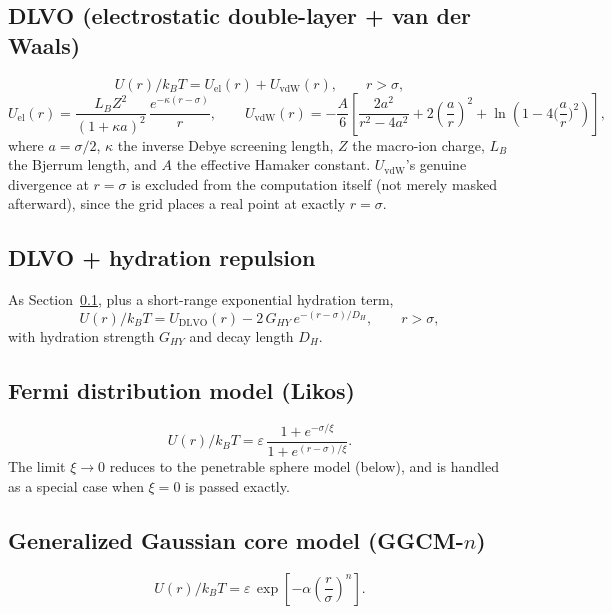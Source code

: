\documentclass[11pt,a4paper]{article}
\begin{document}
\subsection{DLVO (electrostatic double-layer + van der Waals)}
\label{sec:dlvo}
\begin{equation}
  U(r)/k_BT = U_{\mathrm{el}}(r) + U_{\mathrm{vdW}}(r), \qquad r>\sigma,
\end{equation}
\begin{equation}
  U_{\mathrm{el}}(r) = \frac{L_B Z^2}{(1+\kappa a)^2}\,\frac{e^{-\kappa(r-\sigma)}}{r},
  \qquad
  U_{\mathrm{vdW}}(r) = -\frac{A}{6}\left[\frac{2a^2}{r^2-4a^2}+2\left(\frac{a}{r}\right)^2
    +\ln\!\left(1-4\Big(\frac{a}{r}\Big)^2\right)\right],
\end{equation}
where $a=\sigma/2$, $\kappa$ the inverse Debye screening length, $Z$ the
macro-ion charge, $L_B$ the Bjerrum length, and $A$ the effective Hamaker
constant. $U_{\mathrm{vdW}}$'s genuine divergence at $r=\sigma$ is excluded from
the computation itself (not merely masked afterward), since the grid places a
real point at exactly $r=\sigma$.

\subsection{DLVO + hydration repulsion}
As Section~\ref{sec:dlvo}, plus a short-range exponential hydration term,
\begin{equation}
  U(r)/k_BT = U_{\mathrm{DLVO}}(r) - 2\,G_{HY}\,e^{-(r-\sigma)/D_H}, \qquad r>\sigma,
\end{equation}
with hydration strength $G_{HY}$ and decay length $D_H$.

\subsection{Fermi distribution model (Likos)}
\begin{equation}
  U(r)/k_BT = \varepsilon\,\frac{1+e^{-\sigma/\xi}}{1+e^{(r-\sigma)/\xi}}.
\end{equation}
The limit $\xi\to0$ reduces to the penetrable sphere model (below), and is
handled as a special case when $\xi=0$ is passed exactly.

\subsection{Generalized Gaussian core model (GGCM-$n$)}
\begin{equation}
  U(r)/k_BT = \varepsilon\,\exp\!\left[-\alpha\left(\frac{r}{\sigma}\right)^{n}\right].
\end{equation}
\end{document}
